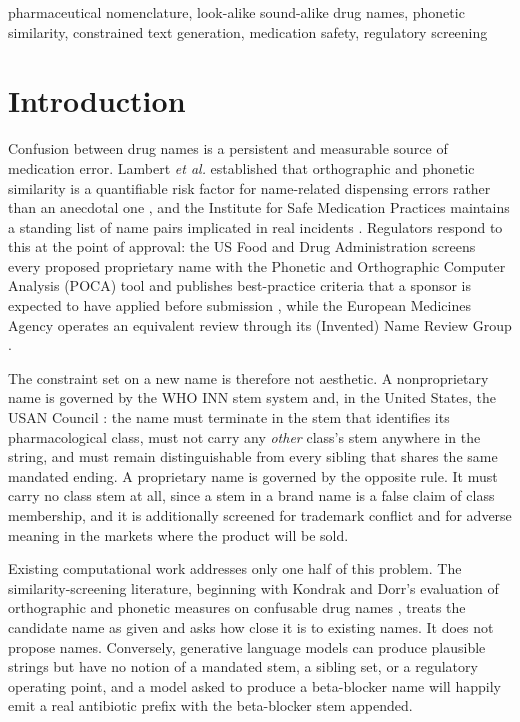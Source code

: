 \documentclass[conference]{IEEEtran}
\begin{document}
\begin{IEEEkeywords}
pharmaceutical nomenclature, look-alike sound-alike drug names, phonetic
similarity, constrained text generation, medication safety, regulatory
screening
\end{IEEEkeywords}

\section{Introduction}

Confusion between drug names is a persistent and measurable source of
medication error. Lambert \textit{et al.} established that orthographic and
phonetic similarity is a quantifiable risk factor for name-related dispensing
errors rather than an anecdotal one \cite{lambert1999}, and the Institute for
Safe Medication Practices maintains a standing list of name pairs implicated in
real incidents \cite{ismp}. Regulators respond to this at the point of approval:
the US Food and Drug Administration screens every proposed proprietary name with
the Phonetic and Orthographic Computer Analysis (POCA) tool \cite{fdapoca} and
publishes best-practice criteria that a sponsor is expected to have applied
before submission \cite{fdaguidance}, while the European Medicines Agency
operates an equivalent review through its (Invented) Name Review Group
\cite{emaguideline}.

The constraint set on a new name is therefore not aesthetic. A nonproprietary
name is governed by the WHO INN stem system \cite{whostem} and, in the United
States, the USAN Council \cite{usanstems}: the name must terminate in the stem
that identifies its pharmacological class, must not carry any \emph{other}
class's stem anywhere in the string, and must remain distinguishable from every
sibling that shares the same mandated ending. A proprietary name is governed by
the opposite rule. It must carry no class stem at all, since a stem in a brand
name is a false claim of class membership, and it is additionally screened for
trademark conflict and for adverse meaning in the markets where the product will
be sold.

Existing computational work addresses only one half of this problem. The
similarity-screening literature, beginning with Kondrak and Dorr's evaluation of
orthographic and phonetic measures on confusable drug names
\cite{kondrak2006,kondrak2004}, treats the candidate name as given and asks how
close it is to existing names. It does not propose names. Conversely, generative
language models can produce plausible strings but have no notion of a mandated
stem, a sibling set, or a regulatory operating point, and a model asked to
produce a beta-blocker name will happily emit a real antibiotic prefix with the
beta-blocker stem appended.
\end{document}
